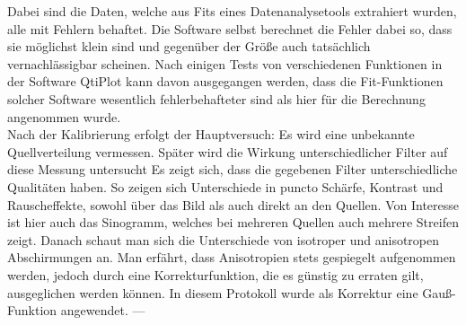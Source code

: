 Dabei sind die Daten, welche aus Fits eines Datenanalysetools extrahiert wurden, alle mit Fehlern behaftet. Die Software selbst berechnet die Fehler dabei so, dass
sie möglichst klein sind und gegenüber der Größe auch tatsächlich vernachlässigbar scheinen. Nach einigen Tests von verschiedenen Funktionen in der Software QtiPlot
kann davon ausgegangen werden, dass die Fit-Funktionen solcher Software wesentlich fehlerbehafteter sind als hier für die Berechnung angenommen wurde.\\
Nach der Kalibrierung erfolgt der Hauptversuch: Es wird eine unbekannte Quellverteilung vermessen. Später wird die Wirkung unterschiedlicher Filter auf diese Messung untersucht
Es zeigt sich, dass die gegebenen Filter unterschiedliche Qualitäten haben. So zeigen sich Unterschiede in puncto Schärfe, Kontrast und Rauscheffekte, sowohl über das Bild als auch direkt an den Quellen.
Von Interesse ist hier auch das Sinogramm, welches bei mehreren Quellen auch mehrere Streifen zeigt. 
Danach schaut man sich die Unterschiede von isotroper und anisotropen Abschirmungen an. Man erfährt, dass Anisotropien stets gespiegelt aufgenommen werden, jedoch durch eine 
Korrekturfunktion, die es günstig zu erraten gilt, ausgeglichen werden können. 
In diesem Protokoll wurde als Korrektur eine Gauß-Funktion angewendet. ---